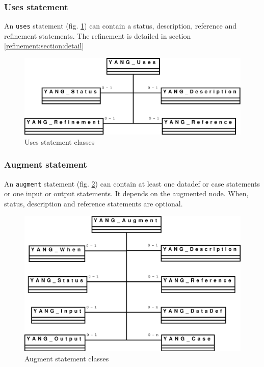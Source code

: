 \documentclass[a4paper]{article}
\begin{document}
\subsubsection{Uses statement}
\label{uses:section:global}

An  {\tt  uses} statement  (fig.  \ref{uses})  can  contain a  status,
description, reference  and refinement statements.   The refinement is
detailed in section \ref{refinement:section:detail}
\begin{figure}[htbp]
\begin{center}
\includegraphics[scale = .3]{uses.eps}
\end{center}
\caption{Uses statement classes}
\label{uses}
\end{figure}

\subsubsection{Augment statement}

An {\tt  augment} statement (fig. \ref{augment}) can  contain at least
one datadef or case statements  or one input or output statements.  It
depends on the augmented node. When, status, description and reference
statements are optional.
\begin{figure}[htbp]
\begin{center}
\includegraphics[scale = .3]{augment.eps}
\end{center}
\caption{Augment statement classes}
\label{augment}
\end{figure}
\end{document}
